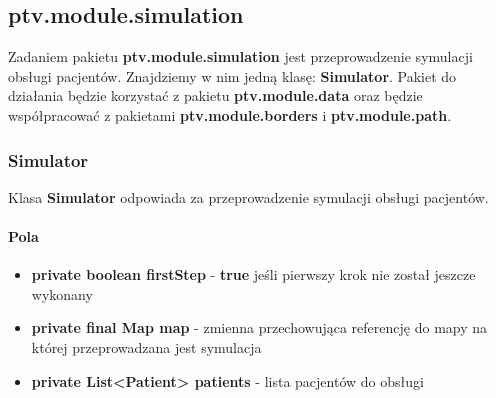 \documentclass[]{article}
\begin{document}
		\subsection{ptv.module.simulation} %
            Zadaniem pakietu \textbf{ptv.module.simulation} jest przeprowadzenie symulacji obsługi pacjentów.
            Znajdziemy w nim jedną klasę: \textbf{Simulator}.
            Pakiet do działania będzie korzystać z pakietu \textbf{ptv.module.data} oraz
            będzie współpracować z pakietami \textbf{ptv.module.borders} i \textbf{ptv.module.path}.
            
            \subsubsection{Simulator}
                Klasa \textbf{Simulator} odpowiada za przeprowadzenie symulacji obsługi pacjentów.
                
                \paragraph{Pola}
                    \begin{itemize}
                        \item \textbf{private boolean firstStep} - \textbf{true} jeśli pierwszy krok nie został jeszcze wykonany
                        \item \textbf{private final Map map} - zmienna przechowująca referencję do mapy na której przeprowadzana jest symulacja
                        \item \textbf{private List<Patient> patients} - lista pacjentów do obsługi
                    \end{itemize}
                    
\end{document}
